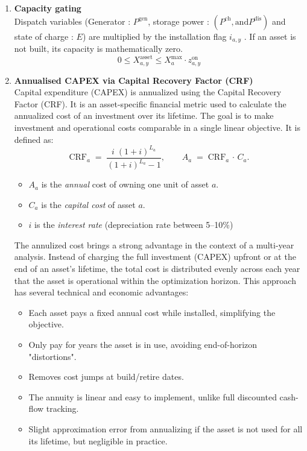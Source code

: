\begin{enumerate}[label=\textbf{\roman*}.]
  \item \textbf{Capacity gating}\\
       Dispatch variables (Generator : $P^{\mathrm{gen}}$, storage power : $(P^{\mathrm{ch}},
       \text{and} P^{\mathrm{dis}})$ and state of charge : $E$) are multiplied by the installation flag $i_{a,y}$ .
       If an asset is not built, its capacity is mathematically zero.
       \[ 0 \leq X^{\text{asset}}_{a,y} \leq X^{\text{max}}_{a} \cdot z^{\text{on}}_{a,y} \]


  \item \textbf{Annualised CAPEX via Capital Recovery Factor (CRF)}\\
      Capital expenditure (CAPEX) is annualized using the Capital Recovery Factor (CRF).  It is an asset-specific financial metric used to calculate the annualized cost of an investment over its lifetime.
      The goal is to make investment and operational costs comparable in a single linear objective. It is defined as:
      \begin{equation}
      \text{CRF}_a \;=\; \frac{i\;(1+i)^{L_a}}{(1+i)^{L_a}-1},
      \qquad
      A_a \;=\; \text{CRF}_a \, \cdot\, C_a.
      \end{equation}
      \begin{itemize}
            \item $A_a$ is the \emph{annual} cost of owning one unit of asset $a$.
            \item $C_a$ is the \emph{capital cost} of asset $a$.
            \item $i$ is the \emph{interest rate} (depreciation rate between 5--10\%) 
      \end{itemize}
      
      The annulized cost brings a strong advantage in the context of a multi-year analysis.
      Instead of charging the full investment (CAPEX) upfront or at the end of an asset's lifetime, 
      the total cost is distributed evenly across each year that the asset is operational within the 
      optimization horizon.
      This approach has several technical and economic advantages:

      \begin{itemize}
            \item Each asset pays a fixed annual cost while installed, simplifying the objective.
            \item Only pay for years the asset is in use, avoiding end-of-horizon "distortions".
            \item Removes cost jumps at build/retire dates.
            \item The annuity is linear and easy to implement, unlike full discounted cash-flow tracking.
            \item Slight approximation error from annualizing if the asset is not used for all its lifetime, 
            but negligible in practice.
      \end{itemize}


\end{enumerate}
